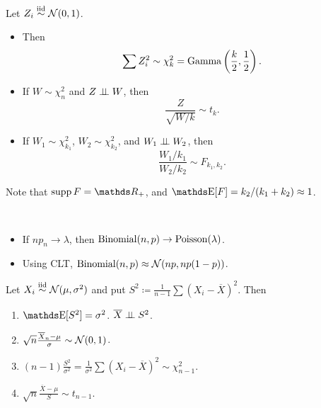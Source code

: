 \begin{definition}
  Let \(Z_i \overset{\mathrm{iid}}{\sim} \mathcal{N}(0, 1)\).
  \begin{itemize}
    \item Then
      \[
        \sum Z_i^2 \sim \chi_k^2 = \operatorname{Gamma}\left(\frac{k}{2}, \frac{1}{2}\right).
      \]
    \item If \(W \sim \chi_n^2\) and \(Z \perp \!\!\! \perp W\), then
      \[
        \frac{Z}{\sqrt{W / k}} \sim t_k.
      \]
    \item If \(W_1 \sim \chi_{k_1}^2\), \(W_2 \sim \chi_{k_2}^2\), and \(W_1 \perp \!\!\! \perp W_2\), then
      \[
        \frac{W_1 / k_1}{W_2 / k_2} \sim F_{k_1, k_2}.
      \]
  \end{itemize}
\end{definition}
Note that \(\supp F = \RR_+\), and \(\E[F] = k_2 / (k_1 + k_2) \approx 1\).


\begin{proposition}~
  \begin{itemize}
    \item If \(np_n \to \lambda\), then \(\operatorname{Binomial}(n, p) \to \operatorname{Poisson}(\lambda)\).
    \item Using CLT, \(\operatorname{Binomial}(n, p) \approx \mathcal{N}(np, np(1 - p))\).
  \end{itemize}
\end{proposition}

\begin{proposition}[\(\Normal\)]
  Let \(X_i \overset{\mathrm{iid}}{\sim} \mathcal{N}(\mu, \sigma^2)\) and put \(S^2 \coloneqq \frac{1}{n - 1} \sum (X_i - \overline{X})^2\).
  Then
  \begin{enumerate}[label=(\roman*)]
    \item \(\E[S^2] = \sigma^2\).
      \(\overline{X} \perp \!\!\! \perp S^2\).
    \item \(\sqrt{n} \frac{\overline{X}_n - \mu}{\sigma} \sim \mathcal{N}(0, 1)\).
    \item \((n - 1) \frac{S^2}{\sigma^2} =  \frac{1}{\sigma^2} \sum (X_i - \overline{X})^2 \sim \chi_{n - 1}^2\).
    \item \(\sqrt{n} \frac{\overline{X} - \mu}{S} \sim t_{n - 1}\).
  \end{enumerate}
\end{proposition}

